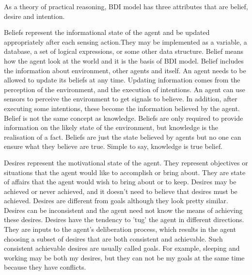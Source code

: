 As a theory of practical reasoning, BDI model has three attributes that are belief, desire and intention.

Beliefs represent the informational state of the agent and be updated appropriately after each sensing action.They may be implemented as a variable, a database, a set of logical expressions, or some other data structure\cite{Rao_BDITheory_1995}. Belief means how the agent look at the world and it is the basis of BDI model. Belief includes the information about environment, other agents and itself. An agent needs to be allowed to update its beliefs at any time. Updating information comes from the perception of the environment, and the execution of intentions. An agent can use sensors to perceive the environment to get signals to believe. In addition, after executing some intentions, these become the information believed by the agent. Belief is not the same concept as knowledge. Beliefs are only required to provide information on the likely state of the environment, but knowledge is the realisation of a fact. Beliefs are just the state believed by agents but no one can ensure what they believe are true. Simple to say, knowledge is true belief.

Desires represent the motivational state of the agent\cite{Rao_BDITheory_1995}. They represent objectives or situations that the agent would like to accomplish or bring about. They are state of affairs that the agent would wish to bring about or to keep. Desires may be achieved or never achieved, and it doesn't need to believe that desires must be achieved. Desires are different from goals although they look pretty similar. Desires can be inconsistent and the agent need not know the means of achieving these desires. Desires have the tendency to 'tug' the agent in different directions. They are inputs to the agent's deliberation process, which results in the agent choosing a subset of desires that are both consistent and achievable. Such consistent achievable desires are usually called goals\cite{Gerhard_MultiSystem_1999}. For example, sleeping and working may be both my desires, but they can not be my goals at the same time because they have conflicts.

